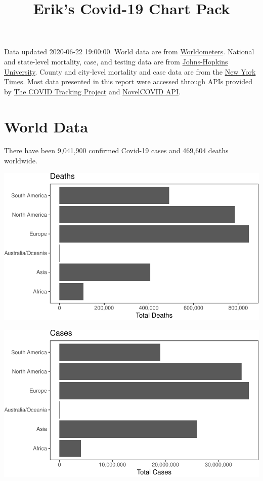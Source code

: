 \documentclass[]{article}
\title{Erik's Covid-19 Chart Pack}
\author{}
\date{}
\begin{document}
\maketitle

Data updated 2020-06-22 19:00:00. World data are from
\href{https://github.com/NovelCovid/API}{Worldometers}. National and
state-level mortality, case, and testing data are from
\href{https://covidtracking.com}{Johns-Hopkins University}. County and
city-level mortality and case data are from the
\href{https://github.com/NovelCovid/API}{New York Times}. Most data
presented in this report were accessed through APIs provided by
\href{https://covidtracking.com}{The COVID Tracking Project} and
\href{https://github.com/NovelCovid/API}{NovelCOVID API}.

\hypertarget{world-data}{%
\section{World Data}\label{world-data}}

There have been 9,041,900 confirmed Covid-19 cases and 469,604 deaths
worldwide.

\includegraphics{covid_files/figure-latex/unnamed-chunk-1-1.pdf}

\includegraphics{covid_files/figure-latex/unnamed-chunk-2-1.pdf}
\end{document}
